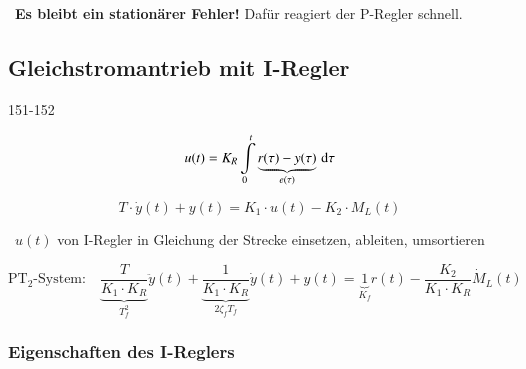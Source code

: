 \textrightarrow\ \textbf{Es bleibt ein stationärer Fehler!} Dafür reagiert der P-Regler schnell.


\subsection{Gleichstromantrieb mit I-Regler}{151-152}

\begin{minipage}[t]{0.48\columnwidth}
    \begin{center}
    \end{center}
    $$ u(t) = K_R \int\limits_0^t \underbrace{ r(\tau) - y(\tau)}_{e(\tau)} \, \mathop{} \! \mathrm{d} \tau $$
\end{minipage}
\hfill
\begin{minipage}[t]{0.48\columnwidth}
    \begin{center}
    \end{center}
    $$ T \cdot \dot{y}(t) + y(t) = K_1 \cdot u(t) - K_2 \cdot M_L(t) $$
\end{minipage}

\textrightarrow\ $u(t)$ von I-Regler in Gleichung der Strecke einsetzen, ableiten, umsortieren

$$ \boxed{ \text{PT}_2 \text{-System:} \quad \underbrace{ \frac{T}{K_1 \cdot K_R} }_{T_f^2} \ddot{y}(t) + \underbrace{ \frac{1}{K_1 \cdot K_R} }_{2 \zeta_f T_f} \dot{y}(t) + y(t) 
    = \underbrace{1}_{K_f} r(t) - \frac{K_2}{K_1 \cdot K_R} \dot{M}_L(t) } $$


\subsubsection{Eigenschaften des I-Reglers}

